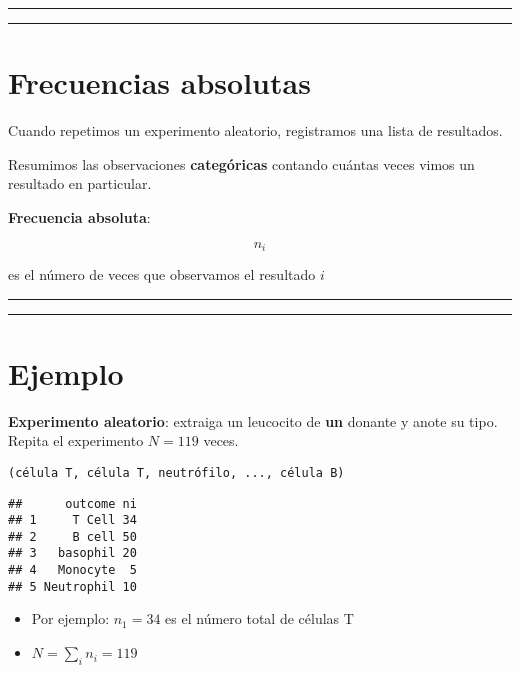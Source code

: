\documentclass[
]{book}
\providecommand{\tightlist}{%
  \setlength{\itemsep}{0pt}\setlength{\parskip}{0pt}}
\begin{document}
\begin{center}\rule{0.5\linewidth}{0.5pt}\end{center}

\begin{center}\rule{0.5\linewidth}{0.5pt}\end{center}

\hypertarget{frecuencias-absolutas}{%
\section{Frecuencias absolutas}\label{frecuencias-absolutas}}

Cuando repetimos un experimento aleatorio, registramos una lista de resultados.

Resumimos las observaciones \textbf{categóricas} contando cuántas veces vimos un resultado en particular.

\textbf{Frecuencia absoluta}:

\[n_i\]

es el número de veces que observamos el resultado \(i\)

\begin{center}\rule{0.5\linewidth}{0.5pt}\end{center}

\begin{center}\rule{0.5\linewidth}{0.5pt}\end{center}

\hypertarget{ejemplo}{%
\section{Ejemplo}\label{ejemplo}}

\textbf{Experimento aleatorio}: extraiga un leucocito de \textbf{un} donante y anote su tipo. Repita el experimento \(N=119\) veces.

\begin{verbatim}
(célula T, célula T, neutrófilo, ..., célula B)
\end{verbatim}

\begin{verbatim}
##      outcome ni
## 1     T Cell 34
## 2     B cell 50
## 3   basophil 20
## 4   Monocyte  5
## 5 Neutrophil 10
\end{verbatim}

\begin{itemize}
\tightlist
\item
  Por ejemplo: \(n_1=34\) es el número total de células T
\item
  \(N=\sum_i n_i=119\)
\end{itemize}
\end{document}
